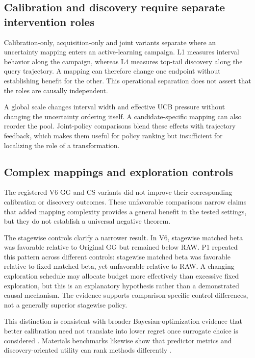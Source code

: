 \documentclass[10pt]{article}
\begin{document}
\subsection{Calibration and discovery require separate intervention roles}
Calibration-only, acquisition-only and joint variants separate where an uncertainty mapping enters an active-learning campaign. L1 measures interval behavior along the campaign, whereas L4 measures top-tail discovery along the query trajectory. A mapping can therefore change one endpoint without establishing benefit for the other. This operational separation does not assert that the roles are causally independent.

A global scale changes interval width and effective UCB pressure without changing the uncertainty ordering itself. A candidate-specific mapping can also reorder the pool. Joint-policy comparisons blend these effects with trajectory feedback, which makes them useful for policy ranking but insufficient for localizing the role of a transformation.

\subsection{Complex mappings and exploration controls}
The registered V6 GG and CS variants did not improve their corresponding calibration or discovery outcomes. These unfavorable comparisons narrow claims that added mapping complexity provides a general benefit in the tested settings, but they do not establish a universal negative theorem.

The stagewise controls clarify a narrower result. In V6, stagewise matched beta was favorable relative to Original GG but remained below RAW. P1 repeated this pattern across different controls: stagewise matched beta was favorable relative to fixed matched beta, yet unfavorable relative to RAW. A changing exploration schedule may allocate budget more effectively than excessive fixed exploration, but this is an explanatory hypothesis rather than a demonstrated causal mechanism. The evidence supports comparison-specific control differences, not a generally superior stagewise policy.

This distinction is consistent with broader Bayesian-optimization evidence that better calibration need not translate into lower regret once surrogate choice is considered \citep{foldager2023uncertainty}. Materials benchmarks likewise show that predictor metrics and discovery-oriented utility can rank methods differently \citep{wang2022benchmark,riebesell2025matbenchdiscovery}.
\end{document}
